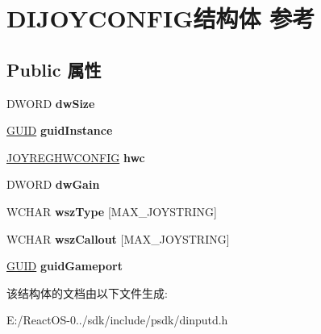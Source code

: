 \hypertarget{struct_d_i_j_o_y_c_o_n_f_i_g}{}\section{D\+I\+J\+O\+Y\+C\+O\+N\+F\+I\+G结构体 参考}
\label{struct_d_i_j_o_y_c_o_n_f_i_g}
\subsection*{Public 属性}
\begin{DoxyCompactItemize}
\item 
\mbox{\label{struct_d_i_j_o_y_c_o_n_f_i_g_a44b04cd489edfce183dddb3aec08ddce}} 
D\+W\+O\+RD {\bfseries dw\+Size}
\item 
\mbox{\label{struct_d_i_j_o_y_c_o_n_f_i_g_afed5f19b59417b4d5333e731be283216}} 
\hyperlink{interface_g_u_i_d}{G\+U\+ID} {\bfseries guid\+Instance}
\item 
\mbox{\label{struct_d_i_j_o_y_c_o_n_f_i_g_a9ad9c529c892aefc0051a4fb4bf52e36}} 
\hyperlink{structjoyreghwconfig__tag}{J\+O\+Y\+R\+E\+G\+H\+W\+C\+O\+N\+F\+IG} {\bfseries hwc}
\item 
\mbox{\label{struct_d_i_j_o_y_c_o_n_f_i_g_ae7096c64aec288f998dbb7cda51954cb}} 
D\+W\+O\+RD {\bfseries dw\+Gain}
\item 
\mbox{\label{struct_d_i_j_o_y_c_o_n_f_i_g_a0d7c24c0b34d515775f99302e92e5a3b}} 
W\+C\+H\+AR {\bfseries wsz\+Type} \mbox{[}M\+A\+X\+\_\+\+J\+O\+Y\+S\+T\+R\+I\+NG\mbox{]}
\item 
\mbox{\label{struct_d_i_j_o_y_c_o_n_f_i_g_ae0bb9175b08a1d966792f26a74fbc5a0}} 
W\+C\+H\+AR {\bfseries wsz\+Callout} \mbox{[}M\+A\+X\+\_\+\+J\+O\+Y\+S\+T\+R\+I\+NG\mbox{]}
\item 
\mbox{\label{struct_d_i_j_o_y_c_o_n_f_i_g_a8dc57fc2d00de32b40858b37ce081212}} 
\hyperlink{interface_g_u_i_d}{G\+U\+ID} {\bfseries guid\+Gameport}
\end{DoxyCompactItemize}


该结构体的文档由以下文件生成\+:\begin{DoxyCompactItemize}
\item 
E\+:/\+React\+O\+S-\/0../sdk/include/psdk/dinputd.\+h\end{DoxyCompactItemize}

